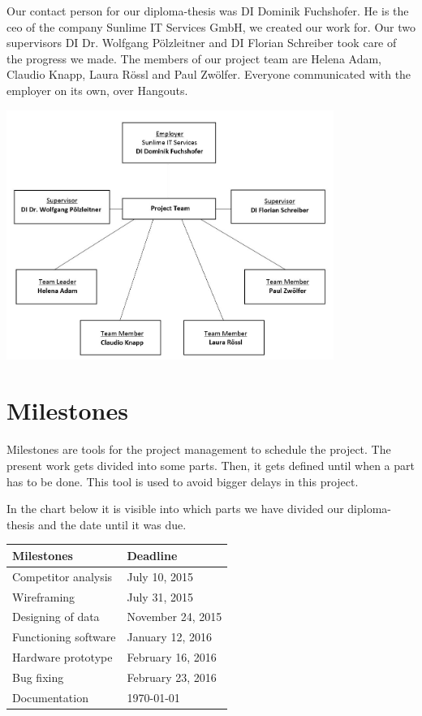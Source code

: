 Our contact person for our diploma-thesis was DI Dominik Fuchshofer. He is the \gls{ceo} of the company Sunlime IT Services GmbH, we created our work for. Our two supervisors DI Dr. Wolfgang Pölzleitner and DI Florian Schreiber took care of the progress we made. The members of our project team are Helena Adam, Claudio Knapp, Laura Rössl and Paul Zwölfer. Everyone communicated with the employer on its own, over Hangouts.
\begin{center}
\includegraphics[width=0.8\textwidth] {bilder/projectdiagram}
\end{center}
\clearpageauthor
\newpage
\section{Milestones}
Milestones are tools for the project management to schedule the project. The present work gets divided into some parts. Then, it gets defined until when a part has to be done. This tool is used to avoid bigger delays in this project.\newline

In the chart below it is visible into which parts we have divided our diploma-thesis and the date until it was due.\newline
\begin{center}
\begin{tabular}{p{5cm}p{5cm}}
\toprule
\textbf{Milestones} & \textbf{Deadline} \\
\midrule
Competitor analysis & July 10, 2015 \\
Wireframing & July 31, 2015 \\
Designing of data & November 24, 2015 \\
Functioning software & January 12, 2016 \\
Hardware prototype & February 16, 2016 \\
Bug fixing & February 23, 2016 \\
Documentation & \today \\
\bottomrule
\end{tabular}
\end{center}
\newpage
